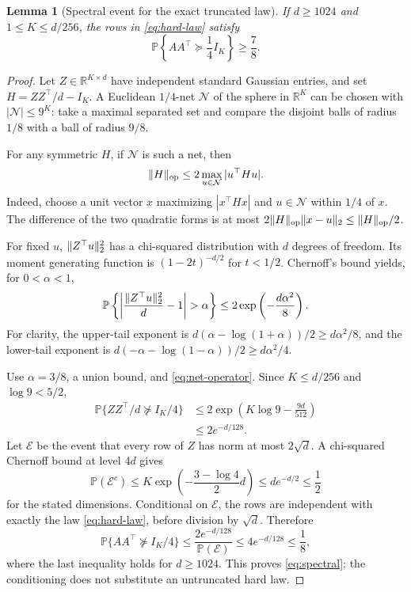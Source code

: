 \documentclass[11pt]{article}
\numberwithin{equation}{section}
\newtheorem{lemma}[lemma]{Lemma}
\theoremstyle{definition}
\theoremstyle{remark}
\newcommand{\R}{\mathbb R}
\newcommand{\PP}{\mathbb P}
\DeclarePairedDelimiter{\norm}{\lVert}{\rVert}
\begin{document}
\begin{lemma}[Spectral event for the exact truncated law]\label{lem:spectral}
If $d\ge1024$ and $1\le K\le d/256$, the rows in \eqref{eq:hard-law} satisfy
\begin{equation}\label{eq:spectral}
\PP\left\{AA^\top\succeq\frac14 I_K\right\}\ge\frac78.
\end{equation}
\end{lemma}
\begin{proof}
Let $Z\in\R^{K\times d}$ have independent standard Gaussian entries, and set $H=ZZ^\top/d-I_K$. A Euclidean $1/4$-net $\mathcal N$ of the sphere in $\R^K$ can be chosen with $|\mathcal N|\le9^K$: take a maximal separated set and compare the disjoint balls of radius $1/8$ with a ball of radius $9/8$.

For any symmetric $H$, if $\mathcal N$ is such a net, then
\begin{equation}\label{eq:net-operator}
\norm{H}_{\mathrm{op}}\le2\max_{u\in\mathcal N}|u^\top Hu|.
\end{equation}
Indeed, choose a unit vector $x$ maximizing $|x^\top Hx|$ and $u\in\mathcal N$ within $1/4$ of $x$. The difference of the two quadratic forms is at most $2\norm{H}_{\mathrm{op}}\norm{x-u}_2\le\norm{H}_{\mathrm{op}}/2$.

For fixed $u$, $\norm{Z^\top u}_2^2$ has a chi-squared distribution with $d$ degrees of freedom. Its moment generating function is $(1-2t)^{-d/2}$ for $t<1/2$. Chernoff's bound yields, for $0<\alpha<1$,
\begin{equation}\label{eq:chisq}
\PP\left\{\left|\frac{\norm{Z^\top u}_2^2}{d}-1\right|>\alpha\right\}
\le2\exp\left(-\frac{d\alpha^2}{8}\right).
\end{equation}
For clarity, the upper-tail exponent is $d(\alpha-\log(1+\alpha))/2\ge d\alpha^2/8$, and the lower-tail exponent is $d(-\alpha-\log(1-\alpha))/2\ge d\alpha^2/4$.

Use $\alpha=3/8$, a union bound, and \eqref{eq:net-operator}. Since $K\le d/256$ and $\log9<5/2$,
\begin{align*}
\PP\{ZZ^\top/d\not\succeq I_K/4\}
&\le 2\exp\left(K\log9-\frac{9d}{512}\right)\\
&\le2e^{-d/128}.
\end{align*}
Let $\mathcal E$ be the event that every row of $Z$ has norm at most $2\sqrt d$. A chi-squared Chernoff bound at level $4d$ gives
\[
\PP(\mathcal E^c)\le K\exp\left(-\frac{3-\log4}{2}d\right)
\le d e^{-d/2}\le\frac12
\]
for the stated dimensions. Conditional on $\mathcal E$, the rows are independent with exactly the law \eqref{eq:hard-law}, before division by $\sqrt d$. Therefore
\[
\PP\{AA^\top\not\succeq I_K/4\}
\le\frac{2e^{-d/128}}{\PP(\mathcal E)}
\le4e^{-d/128}\le\frac18,
\]
where the last inequality holds for $d\ge1024$. This proves \eqref{eq:spectral}; the conditioning does not substitute an untruncated hard law.
\end{proof}
\end{document}
